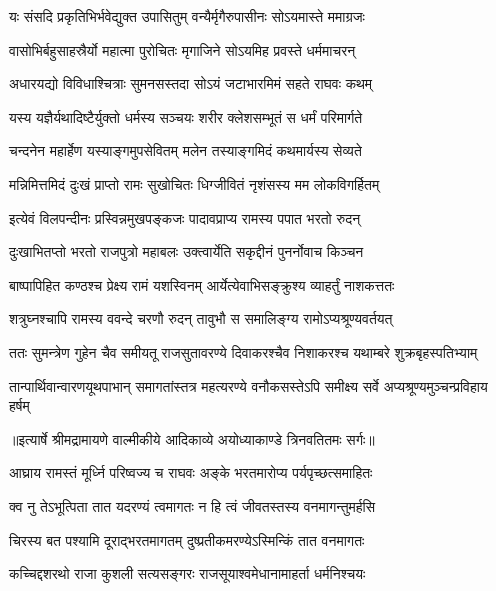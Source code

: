 \twolineshloka
{यः संसदि प्रकृतिभिर्भवेद्युक्त उपासितुम्}
{वन्यैर्मृगैरुपासीनः सोऽयमास्ते ममाग्रजः} %

\twolineshloka
{वासोभिर्बहुसाहस्रैर्यो महात्मा पुरोचितः}
{मृगाजिने सोऽयमिह प्रवस्ते धर्ममाचरन्} %

\twolineshloka
{अधारयद्यो विविधाश्चित्राः सुमनसस्तदा}
{सोऽयं जटाभारमिमं सहते राघवः कथम्} %

\twolineshloka
{यस्य यज्ञैर्यथादिष्टैर्युक्तो धर्मस्य सञ्चयः}
{शरीर क्लेशसम्भूतं स धर्मं परिमार्गते} %

\twolineshloka
{चन्दनेन महार्हेण यस्याङ्गमुपसेवितम्}
{मलेन तस्याङ्गमिदं कथमार्यस्य सेव्यते} %

\twolineshloka
{मन्निमित्तमिदं दुःखं प्राप्तो रामः सुखोचितः}
{धिग्जीवितं नृशंसस्य मम लोकविगर्हितम्} %

\twolineshloka
{इत्येवं विलपन्दीनः प्रस्विन्नमुखपङ्कजः}
{पादावप्राप्य रामस्य पपात भरतो रुदन्} %

\twolineshloka
{दुःखाभितप्तो भरतो राजपुत्रो महाबलः}
{उक्त्वार्येति सकृद्दीनं पुनर्नोवाच किञ्चन} %

\twolineshloka
{बाष्पापिहित कण्ठश्च प्रेक्ष्य रामं यशस्विनम्}
{आर्येत्येवाभिसङ्क्रुश्य व्याहर्तुं नाशकत्ततः} %

\twolineshloka
{शत्रुघ्नश्चापि रामस्य ववन्दे चरणौ रुदन्}
{तावुभौ स समालिङ्ग्य रामोऽप्यश्रूण्यवर्तयत्} %

\fourlineindentedshloka
{ततः सुमन्त्रेण गुहेन चैव}
{समीयतू राजसुतावरण्ये}
{दिवाकरश्चैव निशाकरश्च}
{यथाम्बरे शुक्रबृहस्पतिभ्याम्} %

\fourlineindentedshloka
{तान्पार्थिवान्वारणयूथपाभान्}
{समागतांस्तत्र महत्यरण्ये}
{वनौकसस्तेऽपि समीक्ष्य सर्वे}
{अप्यश्रूण्यमुञ्चन्प्रविहाय हर्षम्} %


{॥इत्यार्षे श्रीमद्रामायणे वाल्मीकीये आदिकाव्ये अयोध्याकाण्डे त्रिनवतितमः सर्गः॥}


\twolineshloka
{आघ्राय रामस्तं मूर्ध्नि परिष्वज्य च राघवः}
{अङ्के भरतमारोप्य पर्यपृच्छत्समाहितः} %

\twolineshloka
{क्व नु तेऽभूत्पिता तात यदरण्यं त्वमागतः}
{न हि त्वं जीवतस्तस्य वनमागन्तुमर्हसि} %

\twolineshloka
{चिरस्य बत पश्यामि दूराद्भरतमागतम्}
{दुष्प्रतीकमरण्येऽस्मिन्किं तात वनमागतः} %

\twolineshloka
{कच्चिद्दशरथो राजा कुशली सत्यसङ्गरः}
{राजसूयाश्वमेधानामाहर्ता धर्मनिश्चयः} %

